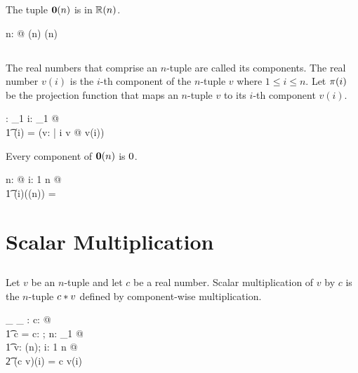 \documentclass[11pt, oneside]{article}
\begin{document}
\begin{remark}
The tuple $\mathbf{0}(n)$ is in $\mathbb{R}(n)$.

\begin{zed}
	\forall n: \nat @
		\zeroRn(n) \in \Rtuples(n)
\end{zed}

\end{remark}

\subsection{}

The real numbers that comprise an $n$-tuple are called its components.
The real number $v(i)$ is the $i$-th component of the $n$-tuple $v$ where
$1 \le i \le n$.
Let $\pi(i)$ be the projection function that maps an $n$-tuple $v$ to its $i$-th component $v(i)$.

\begin{axdef}
	\piR: \nat_1 \fun \Rinf \pfun \R
\where
	\forall i: \nat_1 @ \\
	\t1	\piR(i) = (\lambda v: \Rinf | i \in \dom v @ v(i))
\end{axdef}

\begin{remark}
Every component of $\mathbf{0}(n)$ is $0$.

\begin{zed}
	\forall n: \nat @ \forall i: 1 \upto n @ \\
	\t1	\piR(i)(\zeroRn(n)) = \zeroR
\end{zed}

\end{remark}

\section{Scalar Multiplication}

\subsection{}

Let $v$ be an $n$-tuple and let $c$ be a real number.
Scalar multiplication of $v$ by $c$ is the $n$-tuple $c \mathbin{*} v$ defined by component-wise multiplication.

\begin{axdef}
	\_ \smulR \_ : \R \cross \Rinf \fun \Rinf 
\where
	\forall c: \R @ \\
	\t1	c \smulR \langle \rangle = \langle \rangle
\also
	\forall c: \R; n: \nat_1 @ \\
	\t1	\forall v: \Rtuples(n); i: 1 \upto n @ \\
	\t2		(c \smulR v)(i) = c \mulR v(i)
\end{axdef}
\end{document}

